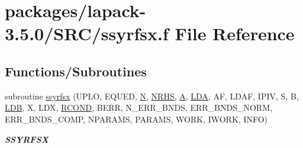 \hypertarget{ssyrfsx_8f}{}\section{packages/lapack-\/3.5.0/\+S\+R\+C/ssyrfsx.f File Reference}
\label{ssyrfsx_8f}
\subsection*{Functions/\+Subroutines}
\begin{DoxyCompactItemize}
\item 
subroutine \hyperlink{group__realSYcomputational_ga40ae1ffd0fcd22c6a196c09fa660a5cd}{ssyrfsx} (U\+P\+L\+O, E\+Q\+U\+E\+D, \hyperlink{polmisc_8c_a0240ac851181b84ac374872dc5434ee4}{N}, \hyperlink{example__user_8c_aa0138da002ce2a90360df2f521eb3198}{N\+R\+H\+S}, \hyperlink{classA}{A}, \hyperlink{example__user_8c_ae946da542ce0db94dced19b2ecefd1aa}{L\+D\+A}, A\+F, L\+D\+A\+F, I\+P\+I\+V, S, B, \hyperlink{example__user_8c_a50e90a7104df172b5a89a06c47fcca04}{L\+D\+B}, X, L\+D\+X, \hyperlink{superlu__enum__consts_8h_af00a42ecad444bbda75cde1b64bd7e72a9b5c151728d8512307565994c89919d5}{R\+C\+O\+N\+D}, B\+E\+R\+R, N\+\_\+\+E\+R\+R\+\_\+\+B\+N\+D\+S, E\+R\+R\+\_\+\+B\+N\+D\+S\+\_\+\+N\+O\+R\+M, E\+R\+R\+\_\+\+B\+N\+D\+S\+\_\+\+C\+O\+M\+P, N\+P\+A\+R\+A\+M\+S, P\+A\+R\+A\+M\+S, W\+O\+R\+K, I\+W\+O\+R\+K, I\+N\+F\+O)
\begin{DoxyCompactList}\small\item\em {\bfseries S\+S\+Y\+R\+F\+S\+X} \end{DoxyCompactList}\end{DoxyCompactItemize}
